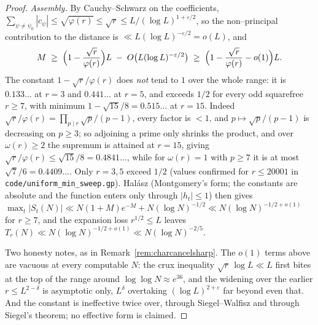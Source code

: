 \documentclass[11pt]{article}
\theoremstyle{definition}
\begin{document}
\begin{proof}
\emph{Assembly.} By Cauchy--Schwarz on the coefficients,
$\sum_{\psi\ne\psi_0}|c_\psi|\le\sqrt{\varphi(r)}\le\sqrt r\le L/(\log L)^{1+\varepsilon/2}$, so the
non--principal contribution to the distance is $\ll L(\log L)^{-\varepsilon/2}=o(L)$, and
\[ M\;\ge\;\Bigl(1-\frac{\sqrt r}{\varphi(r)}\Bigr)L\;-\;O\bigl(L(\log L)^{-\varepsilon/2}\bigr)
   \;\ge\;\Bigl(1-\frac{\sqrt r}{\varphi(r)}-o(1)\Bigr)L . \]
The constant $1-\sqrt r/\varphi(r)$ does \emph{not} tend to $1$ over the whole range: it is
$0.133\ldots$ at $r=3$ and $0.441\ldots$ at $r=5$, and exceeds $1/2$ for every odd squarefree
$r\ge7$, with minimum $1-\sqrt{15}/8=0.515\ldots$ at $r=15$. Indeed
$\sqrt r/\varphi(r)=\prod_{p\mid r}\sqrt p/(p-1)$, every factor is $<1$, and $p\mapsto\sqrt p/(p-1)$
is decreasing on $p\ge3$; so adjoining a prime only shrinks the product, and over $\omega(r)\ge2$
the supremum is attained at $r=15$, giving $\sqrt r/\varphi(r)\le\sqrt{15}/8=0.4841\ldots$, while
for $\omega(r)=1$ with $p\ge7$ it is at most $\sqrt7/6=0.4409\ldots$. Only $r=3,5$ exceed $1/2$
\textup{(}values confirmed for $r\le20001$ in \texttt{code/uniform\_min\_sweep.gp}\textup{)}. Hal\'asz
(Montgomery's form; the constants are absolute and the function enters only through $|h_t|\le1$)
then gives $\max_t|S_t(N)|\ll N(1+M)e^{-M}+N(\log N)^{-1/2}\ll N(\log N)^{-1/2+o(1)}$ for
$r\ge7$, and the expansion loss $r^{1/2}\le L$ leaves
$T_r(N)\ll N(\log N)^{-1/2+o(1)}\ll N(\log N)^{-2/5}$.

Two honesty notes, as in Remark~\ref{rem:charcancelsharp}. The $o(1)$ terms above are vacuous at
every computable $N$: the crux inequality $\sqrt r\,\log L\ll L$ first bites at the top of the
range around $\log\log N\approx e^{36}$, and the widening over the earlier $r\le L^{2-\delta}$ is
asymptotic only, $L^{\delta}$ overtaking $(\log L)^{2+\varepsilon}$ far beyond even that. And the constant is ineffective twice over,
through Siegel--Walfisz and through Siegel's theorem; no effective form is claimed.
\end{proof}
\end{document}

